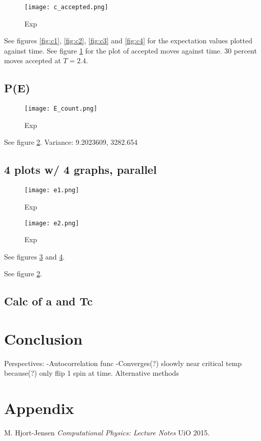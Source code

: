 \documentclass[norsk, 10pt, twocolumn, a4paper]{revtex4}
\begin{document}
\begin{figure}
    \texttt{[image: c\_accepted.png]}
    \caption{
        \label{fig:c5}
        Exp}
\end{figure}

See figures \ref{fig:c1}, \ref{fig:c2}, \ref{fig:c3} and \ref{fig:c4} for the expectation values plotted against time.
See figure \ref{fig:c5} for the plot of accepted moves against time. 30 percent moves accepted at $T=2.4$.

\subsection{P(E)}
\begin{figure}
    \texttt{[image: E\_count.png]}
    \caption{
        \label{fig:d1}
        Exp}
\end{figure}
See figure \ref{fig:d1}.
Variance: 9.2023609, 3282.654

\subsection{4 plots w/ 4 graphs, parallel}
\begin{figure}
    \texttt{[image: e1.png]}
    \caption{
        \label{fig:e1}
        Exp}
\end{figure}
\begin{figure}
    \texttt{[image: e2.png]}
    \caption{
        \label{fig:e2}
        Exp}
\end{figure}
See figures \ref{fig:e1} and \ref{fig:e2}.


See figure \ref{fig:d1}.

\subsection{Calc of a and Tc}

\section{Conclusion}
Perspectives:
-Autocorrelation func
-Converges(?) sloowly near critical temp because(?) only flip 1 spin at time. Alternative methods


\cite{komp}
\section{Appendix}


\begin{thebibliography}{1}
 M. Hjort-Jensen {\em Computational Physics: Lecture Notes}  UiO 2015.

\end{thebibliography}
\end{document}
